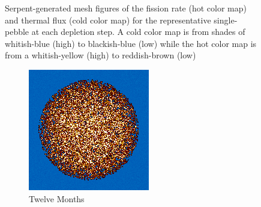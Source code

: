 \begin{figure}[H]
\caption[Serpent-Generated Mesh Figures of the Fission Rate and Thermal Flux for the Representative Single-Pebble at each Depletion Step]{Serpent-generated mesh figures of the fission rate (hot color map) and thermal flux (cold color map) for the representative single-pebble at each depletion step.  A cold color map is from shades of whitish-blue (high) to blackish-blue (low) while the hot color map is from a whitish-yellow (high) to reddish-brown (low)}
\end{figure}

\begin{figure}[H]\ContinuedFloat
\centering

\begin{subfigure}{0.4\textwidth}
  \includegraphics[width=0.95\linewidth]{figures/burn-20-bstep2}
  \caption{Twelve Months}
  \label{fig:bstep2}
\end{subfigure}%
%
\begin{subfigure}{0.4\textwidth}

\end{subfigure}
\end{figure}
